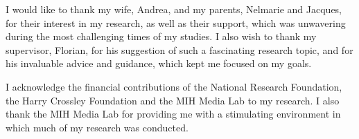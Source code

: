 I would like to thank my wife, Andrea, and my parents, Nelmarie and Jacques, for their interest in my research, as well as their support, which was unwavering during the most challenging times of my studies. I also wish to thank my supervisor, Florian, for his suggestion of such a fascinating research topic, and for his invaluable advice and guidance, which kept me focused on my goals.

I acknowledge the financial contributions of the National Research Foundation, the Harry Crossley Foundation and the MIH Media Lab to my research. I also thank the MIH Media Lab for providing me with a stimulating environment in which much of my research was conducted.

